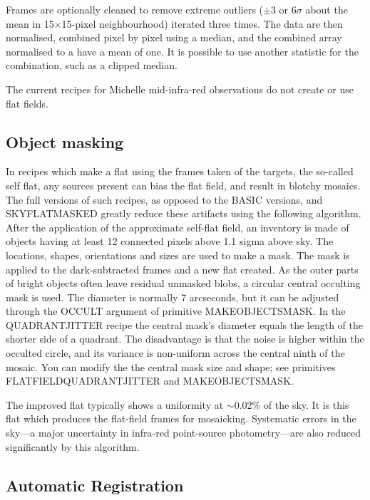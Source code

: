 \documentclass[twoside,11pt]{article}
\newcommand{\htmlref}[2]{#1}
\newcommand{\xlabel}[1]{}
\renewcommand{\_}{\texttt{\symbol{95}}}
\begin{document}
Frames are optionally cleaned to remove extreme outliers ($\pm$3 or
6$\sigma$ about the mean in 15$\times$15-pixel neighbourhood) iterated
three times.  The data are then normalised, combined pixel by pixel
using a median, and the combined array normalised to a have a mean of
one.  It is possible to use another statistic for the combination,
such as a clipped median.

The current recipes for Michelle mid-infra-red observations do not
create or use flat fields.

\subsection{\xlabel{object_masking}Object masking\label{object_masking}}

In recipes which make a flat using the frames taken of the targets,
the so-called self flat, any sources present can bias the flat field,
and result in blotchy mosaics.  The full versions of such recipes, as
opposed to the \_BASIC versions, and
\htmlref{SKY\_FLAT\_MASKED}{SKY\_FLAT\_MASKED} greatly reduce
these artifacts using the following algorithm.  After the application
of the approximate self-flat field, an inventory is made of objects
having at least 12 connected pixels above 1.1 sigma above sky.  The
locations, shapes, orientations and sizes are used to make a mask.
The mask is applied to the dark-subtracted frames and a new flat
created.  As the outer parts of bright objects often leave residual
unmasked blobs, a circular central occulting mask is used.  The
diameter is normally 7 arcseconds, but it can be adjusted through the
OCCULT argument of primitive \_MAKE\_OBJECTS\_MASK\_.  In the
\htmlref{QUADRANT\_JITTER}{QUADRANT\_JITTER} recipe the central mask's
diameter equals the length of the shorter side of a quadrant.  The
disadvantage is that the noise is higher within the occulted circle,
and its variance is non-uniform across the central ninth of the mosaic.
You can modify the the central mask size and shape; see primitives 
\_FLAT\_FIELD\_QUADRANT\_JITTER\_ and \_MAKE\_OBJECTS\_MASK\_.

The improved flat typically shows a uniformity at $\sim$0.02\% of the
sky. It is this flat which produces the flat-field frames for
mosaicking.  Systematic errors in the sky---a major uncertainty in
infra-red point-source photometry---are also reduced significantly by
this algorithm.

\subsection{\xlabel{automatic_registration}Automatic
Registration\label{automatic_registration}}
\end{document}
